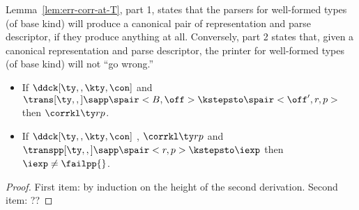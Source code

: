 Lemma~\ref{lem:err-corr-at-T}, part 1, states that the parsers for
well-formed types (of base kind) will produce a canonical pair of
representation and parse descriptor, if they produce anything at all.
Conversely, part 2 states that, given a canonical representation and
parse descriptor, the printer for well-formed types (of base kind)
will not ``go wrong.''

\begin{lemma}
\label{lem:err-corr-at-T}
\begin{itemize}
\item If $\ddck[\ty,,\kty,\con]$ and $\trans[\ty,,] \sapp \spair<B,\off> \kstepsto
  \spair<\off',r,p>$ then $\corrkl \ty r p$.
\item If $\ddck[\ty,,\kty,\con]$ , $\corrkl \ty r p$ and
  $\transpp[\ty,,] \sapp \spair<r,p> \kstepsto \iexp$ then $\iexp \neq
  \failpp{}$.
\end{itemize}
\end{lemma}

\begin{proof}
  First item: by induction on the height of the second derivation.
  Second item: ??
\end{proof}



